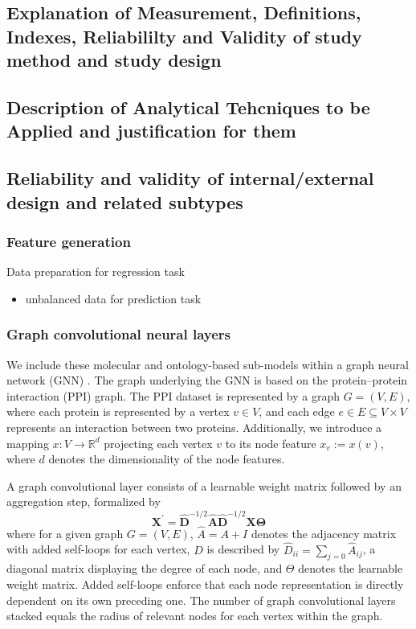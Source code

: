 \documentclass[]{article}
\renewcommand{\cite}{\citep}
\begin{document}
\subsection*{Explanation of Measurement, Definitions, Indexes, Reliabililty and Validity of study method and study design}
\subsection*{Description of Analytical Tehcniques to be Applied and justification for them}

\subsection*{Reliability and validity of internal/external design and related subtypes}

\subsubsection{Feature generation}

Data preparation for regression task
\begin{itemize}
	\item unbalanced data for prediction task
\end{itemize}

\subsubsection{Graph convolutional neural layers}

We include these molecular and ontology-based sub-models within a
graph neural network (GNN) \cite{GCNConv}. The graph underlying the GNN is
based on the protein--protein interaction (PPI) graph. The PPI dataset
is represented by a graph $G=(V,E)$, where each protein is represented
by a vertex $v\in V$, and each edge $e\in E\subseteq V\times V$
represents an interaction between two proteins. Additionally, we
introduce a mapping $x:V\rightarrow\mathbb{R}^{d}$ projecting each
vertex $v$ to its node feature $x_v := x(v)$, where $d$ denotes the
dimensionality of the node features.

A graph convolutional layer \cite{GCNConv} consists of a learnable
weight matrix followed by an aggregation step, formalized by
\begin{equation}
	\mathbf{X}^{\prime} = \mathbf{\hat{D}}^{-1/2} \mathbf{\hat{A}}
	\mathbf{\hat{D}}^{-1/2} \mathbf{X} \mathbf{\Theta}
\end{equation}
where for a given graph $G=(V,E)$, $\hat{A} = A + I$ denotes the
adjacency matrix with added self-loops for each vertex, $D$ is
described by $\hat{D}_{ii} = \sum_{j=0} \hat{A}_{ij}$, a diagonal
matrix displaying the degree of each node, and $\Theta$ denotes the
learnable weight matrix. Added self-loops enforce that each node
representation is directly dependent on its own preceding one. The
number of graph convolutional layers stacked equals the radius of
relevant nodes for each vertex within the graph.
\end{document}

